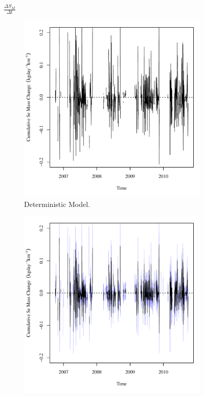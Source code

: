 \subfiguretop
\begin{landscape}
	\begin{figure}
		$ \displaystyle \frac{\Delta S_{M}}{\Delta t} $
		\begin{subfigure}{0.7\textwidth}
			\centering
			\includegraphics[width=\tableCustomSize]{"Figures/Results_USR/Deterministic/Balance Mass - Storage"}
			\caption{Deterministic Model.}
		\end{subfigure}%
		\begin{subfigure}{0.7\textwidth}
			\centering
			\includegraphics[width=\tableCustomSize]{"Figures/Results_USR/Stochastic/Balance Mass - Storage"}

\end{subfigure}
\end{figure}
\end{landscape}
